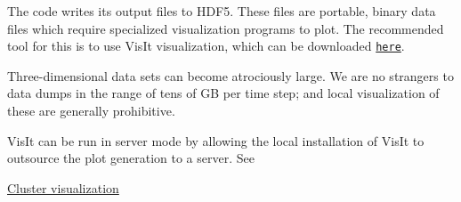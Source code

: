 The code writes its output files to H\+D\+F5. These files are portable, binary data files which require specialized visualization programs to plot. The recommended tool for this is to use Vis\+It visualization, which can be downloaded \href{https://wci.llnl.gov/simulation/computer-codes/visit/executables}{\tt here}.

Three-\/dimensional data sets can become atrociously large. We are no strangers to data dumps in the range of tens of GB per time step; and local visualization of these are generally prohibitive.

Vis\+It can be run in server mode by allowing the local installation of Vis\+It to outsource the plot generation to a server. See
\begin{DoxyItemize}
\item \hyperlink{visualization-cluster}{Cluster visualization} 
\end{DoxyItemize}